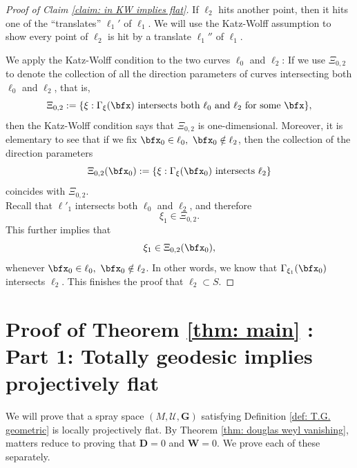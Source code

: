 \documentclass{article}
\newcommand{\bG}{\mathbf{G}}
\numberwithin{equation}{section}
\theoremstyle{plain}
\begin{document}
\begin{proof}[Proof of Claim \ref{claim: in KW implies flat}]
    If $\ell_2$ hits another point, then it hits one of the ``translates'' $\ell_1'$ of $\ell_1$. We will use the Katz-Wolff assumption to show every point of $\ell_2$ is hit by a translate $\ell_1''$ of $\ell_1$.
    
    We apply the Katz-Wolff condition to the two curves $\ell_0$ and $\ell_2$: If we use $\Xi_{0, 2}$ to denote the collection of all the direction parameters of curves intersecting both $\ell_0$ and $\ell_2$, that is, 
    \begin{equation}
    \Xi_{0, 2}:=\{\xi: \Gamma_{\xi}(\bfx) \text{ intersects both } \ell_0  \text{ and } \ell_2 \text{ for some } \bfx\},
    \end{equation}
 then the Katz-Wolff condition says that $\Xi_{0, 2}$ is one-dimensional. Moreover, it is elementary to see that if we fix $\bfx_0\in \ell_0, \ \bfx_0\notin\ell_2$, then the collection of the direction parameters 
 \begin{equation}
 \Xi_{0, 2}(\bfx_0):= \{\xi: \Gamma_{\xi}(\bfx_0) \text{ intersects } \ell_2\}
 \end{equation}
 coincides with $\Xi_{0, 2}$. \\
 
 Recall that $\ell'_1$ intersects both $\ell_0$ and $\ell_2$, and therefore 
 \begin{equation}
 \xi_1\in \Xi_{0, 2}.
 \end{equation}
 This further implies that 
 \begin{equation}
  \xi_1\in \Xi_{0, 2}(\bfx_0),
 \end{equation}
 whenever $\bfx_0\in \ell_0, \ \bfx_0\notin \ell_2$. In other words, we know that $\Gamma_{\xi_1}(\bfx_0)$ intersects $\ell_2$. This finishes the proof that $\ell_2\subset S$. 
\end{proof}










\section{Proof of Theorem \ref{thm: main} :  Part 1: Totally geodesic implies projectively flat}\label{251003sec9}





We will prove that a spray space $(M, \mathcal U, \bG)$ satisfying Definition \ref{def: T.G. geometric} is locally projectively flat. By Theorem \ref{thm: douglas weyl vanishing}, matters reduce to proving that $\mathbf D = 0$ and $\mathbf W = 0$. We prove each of these separately. 
\end{document}

